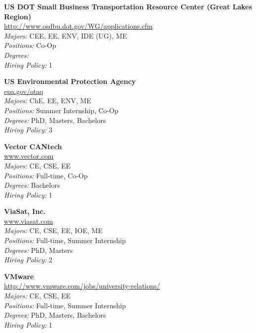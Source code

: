 \documentclass{article}
\begin{document}
\begin{center}
\begin{multicols}{3}
\begin{minipage}{.9\columnwidth}{\Large\bf US DOT Small Business Transportation Resource Center (Great Lakes Region) }\\
	\url{http://www.osdbu.dot.gov/WG/applications.cfm}\\
	\emph{Majors:} CEE, EE, ENV, IDE (UG), ME\\
	\emph{Positions:} Co-Op\\
	\emph{Degrees:} \\
	\emph{Hiring Policy:} 1\\
\end{minipage}
 
\begin{minipage}{.9\columnwidth}{\Large\bf US Environmental Protection Agency }\\
	\url{epa.gov/otaq}\\
	\emph{Majors:} ChE, EE, ENV, ME\\
	\emph{Positions:} Summer Internship, Co-Op\\
	\emph{Degrees:} PhD, Masters, Bachelors\\
	\emph{Hiring Policy:} 3\\
\end{minipage}
 
\begin{minipage}{.9\columnwidth}{\Large\bf Vector CANtech }\\
	\url{www.vector.com}\\
	\emph{Majors:} CE, CSE, EE\\
	\emph{Positions:} Full-time, Co-Op\\
	\emph{Degrees:} Bachelors\\
	\emph{Hiring Policy:} 1\\
\end{minipage}
 
\begin{minipage}{.9\columnwidth}{\Large\bf ViaSat, Inc. }\\
	\url{www.viasat.com}\\
	\emph{Majors:} CE, CSE, EE, IOE, ME\\
	\emph{Positions:} Full-time, Summer Internship\\
	\emph{Degrees:} PhD, Masters\\
	\emph{Hiring Policy:} 2\\
\end{minipage}
 
\begin{minipage}{.9\columnwidth}{\Large\bf VMware }\\
	\url{http://www.vmware.com/jobs/university-relations/}\\
	\emph{Majors:} CE, CSE, EE\\
	\emph{Positions:} Full-time, Summer Internship\\
	\emph{Degrees:} PhD, Masters, Bachelors\\
	\emph{Hiring Policy:} 1\\
\end{minipage}
 

\end{multicols}
\end{center}
\end{document}
